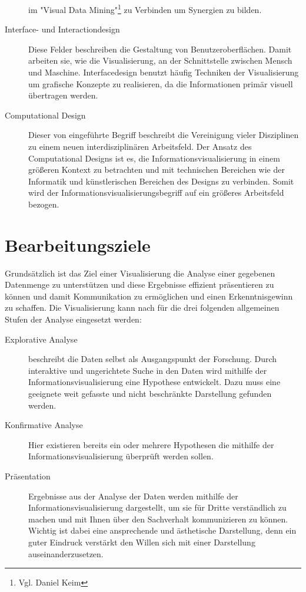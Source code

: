 \documentclass[a4paper, 12pt, DIVcalc, onepage, pdftex, headsepline, footsepline]{scrreprt}
\begin{document}
\begin{description}
im "Visual Data Mining"\footnote{Vgl. Daniel Keim} zu Verbinden um Synergien zu bilden.
\item[Interface- und Interactiondesign]
Diese Felder beschreiben die Gestaltung von Benutzeroberflächen. Damit arbeiten sie, wie die Visualisierung, an
der Schnittstelle zwischen Mensch und Maschine. Interfacedesign benutzt häufig Techniken der Visualisierung
um grafische Konzepte zu realisieren, da die Informationen primär visuell übertragen werden.
\item[Computational Design]
Dieser von \citep{BenFry} eingeführte Begriff beschreibt die Vereinigung vieler Disziplinen zu einem neuen
interdisziplinären Arbeitsfeld. Der Ansatz des Computational Designs ist es, die Informationsvisualisierung in einem größeren
Kontext zu betrachten und mit technischen Bereichen wie der Informatik und künstlerischen
Bereichen des Designs zu verbinden. Somit wird der Informationsvisualisierungsbegriff auf ein größeres Arbeitsfeld
bezogen.
\end{description}

\section{Bearbeitungsziele}
\label{sec:Ziele}
Grundsätzlich ist das Ziel einer Visualisierung die Analyse einer gegebenen Datenmenge zu unterstützen und diese
Ergebnisse effizient präsentieren zu können und damit Kommunikation zu ermöglichen und einen Erkenntnisgewinn zu schaffen.
Die Visualisierung kann nach \citep{Schumann} für die drei folgenden allgemeinen Stufen der Analyse eingesetzt werden:
\begin{description}
\item[Explorative Analyse]
beschreibt die Daten selbst als Ausgangspunkt der Forschung. Durch interaktive und ungerichtete Suche in den Daten
wird mithilfe der Informationsvisualisierung eine Hypothese entwickelt. Dazu muss eine geeignete weit gefasste und nicht
beschränkte Darstellung gefunden werden.
\item[Konfirmative Analyse]
Hier existieren bereits ein oder mehrere Hypothesen die mithilfe der Informationsvisualisierung überprüft werden sollen.
\item[Präsentation]
Ergebnisse aus der Analyse der Daten werden mithilfe der Informationsvisualisierung dargestellt, um sie für Dritte verständlich
zu machen und mit Ihnen über den Sachverhalt kommunizieren zu können.
Wichtig ist dabei eine ansprechende und ästhetische Darstellung, denn
ein guter Eindruck verstärkt den Willen sich mit einer Darstellung auseinanderzusetzen.
\end{description}
\end{document}
